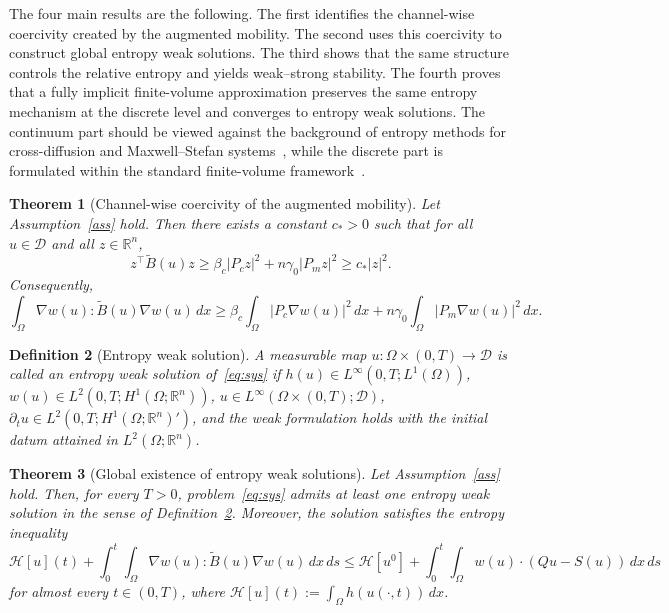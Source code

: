 \documentclass{article}
\newtheorem{theorem}{Theorem}[section]
\newtheorem{definition}[theorem]{Definition}
\newcommand{\R}{\mathbb{R}}
\newcommand{\D}{\mathcal{D}}
\newcommand{\Be}{\widetilde{B}}       %
\newcommand{\HH}{\mathcal{H}}         %
\newcommand{\Pc}{P_c}                 %
\newcommand{\Pm}{P_m}                 %
\begin{document}
The four main results are the following. The first identifies the
channel-wise coercivity created by the augmented mobility. The second
uses this coercivity to construct global entropy weak solutions. The
third shows that the same structure controls the relative entropy and
yields weak--strong stability. The fourth proves that a fully implicit
finite-volume approximation preserves the same entropy mechanism at the
discrete level and converges to entropy weak solutions. The continuum
part should be viewed against the background of entropy methods for
cross-diffusion and Maxwell--Stefan
systems~\cite{JungelStelzer2013,Jungel2015,Jungel2017}, while the
discrete part is formulated within the standard finite-volume
framework~\cite{Eymard2000,EymardGallouetHerbich2002,BessemoulinFilbet2012}.

\begin{theorem}[Channel-wise coercivity of the augmented mobility]
\label{thm:coer}
Let Assumption~\ref{ass} hold. Then there exists a constant $c_*>0$
such that for all $u\in\D$ and all $z\in\R^n$,
\begin{equation}\label{eq:coer}
  z^\top\Be(u)z \ge \beta_c|\Pc z|^2 + n\gamma_0|\Pm z|^2 \ge c_*|z|^2.
\end{equation}
Consequently,
\begin{equation}\label{eq:coer_int}
  \int_\Omega \nabla w(u):\Be(u)\nabla w(u)\,dx
  \ge \beta_c\int_\Omega|\Pc\nabla w(u)|^2\,dx
    + n\gamma_0\int_\Omega|\Pm\nabla w(u)|^2\,dx.
\end{equation}
\end{theorem}

\begin{definition}[Entropy weak solution]\label{def:weak}
A measurable map $u:\Omega\times(0,T)\to\D$ is called an
\emph{entropy weak solution} of~\eqref{eq:sys} if
$h(u)\in L^\infty(0,T;L^1(\Omega))$,
$w(u)\in L^2(0,T;H^1(\Omega;\R^n))$,
$u\in L^\infty(\Omega\times(0,T);\D)$,
$\partial_t u\in L^2(0,T;H^1(\Omega;\R^n)')$,
and the weak formulation holds with the initial datum attained in
$L^2(\Omega;\R^n)$.
\end{definition}

\begin{theorem}[Global existence of entropy weak solutions]
\label{thm:exist}
Let Assumption~\ref{ass} hold. Then, for every $T>0$, problem~\eqref{eq:sys}
admits at least one entropy weak solution in the sense of
Definition~\ref{def:weak}. Moreover, the solution satisfies the
entropy inequality
\begin{equation}\label{eq:entineq}
  \HH[u](t)
  + \int_0^t\!\int_\Omega \nabla w(u):\Be(u)\nabla w(u)\,dx\,ds
  \le \HH[u^0]
  + \int_0^t\!\int_\Omega w(u)\cdot(Qu-S(u))\,dx\,ds
\end{equation}
for almost every $t\in(0,T)$, where
$\HH[u](t) := \int_\Omega h(u(\cdot,t))\,dx$.
\end{theorem}
\end{document}
